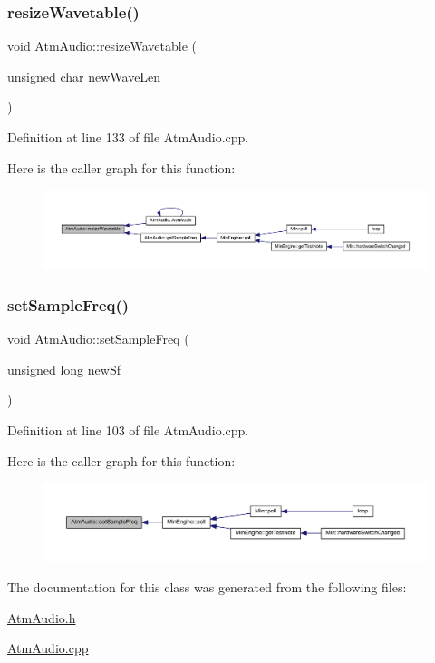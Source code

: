 \subsubsection{\texorpdfstring{resize\+Wavetable()}{resizeWavetable()}}
{\footnotesize\ttfamily void Atm\+Audio\+::resize\+Wavetable (\begin{DoxyParamCaption}\item[{unsigned char}]{new\+Wave\+Len }\end{DoxyParamCaption})}



Definition at line 133 of file Atm\+Audio.\+cpp.

Here is the caller graph for this function\+:
\nopagebreak
\begin{figure}[H]
\begin{center}
\leavevmode
\includegraphics[width=350pt]{class_atm_audio_ab634d78d1e88550a4ed0ff1d93ed2d97_icgraph}
\end{center}
\end{figure}
\mbox{\label{class_atm_audio_ab27c4dabb9e47a386de693b47422bb2a}} 
\subsubsection{\texorpdfstring{set\+Sample\+Freq()}{setSampleFreq()}}
{\footnotesize\ttfamily void Atm\+Audio\+::set\+Sample\+Freq (\begin{DoxyParamCaption}\item[{unsigned long}]{new\+Sf }\end{DoxyParamCaption})}



Definition at line 103 of file Atm\+Audio.\+cpp.

Here is the caller graph for this function\+:
\nopagebreak
\begin{figure}[H]
\begin{center}
\leavevmode
\includegraphics[width=350pt]{class_atm_audio_ab27c4dabb9e47a386de693b47422bb2a_icgraph}
\end{center}
\end{figure}


The documentation for this class was generated from the following files\+:\begin{DoxyCompactItemize}
\item 
\hyperlink{_atm_audio_8h}{Atm\+Audio.\+h}\item 
\hyperlink{_atm_audio_8cpp}{Atm\+Audio.\+cpp}\end{DoxyCompactItemize}
